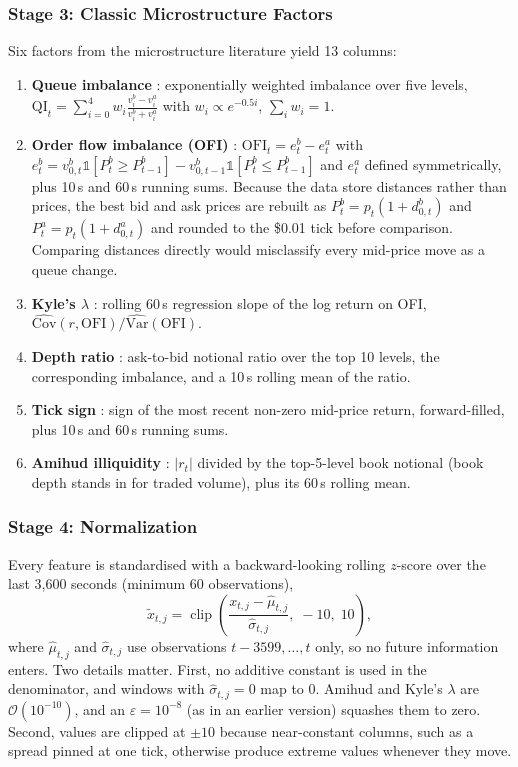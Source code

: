 \subsubsection{Stage 3: Classic Microstructure Factors}
Six factors from the microstructure literature yield 13 columns:
\begin{enumerate}
  \item \textbf{Queue imbalance} \cite{cont2014}: exponentially weighted imbalance over
  five levels, $\mathrm{QI}_t = \sum_{i=0}^{4} w_i \frac{v^b_i - v^a_i}{v^b_i + v^a_i}$ with
  $w_i \propto e^{-0.5 i}$, $\sum_i w_i = 1$.
  \item \textbf{Order flow imbalance (OFI)} \cite{cont2014}:
  $\mathrm{OFI}_t = e^b_t - e^a_t$ with
  $e^b_t = v^b_{0,t}\mathbb{1}[P^b_t \ge P^b_{t-1}] - v^b_{0,t-1}\mathbb{1}[P^b_t \le P^b_{t-1}]$
  and $e^a_t$ defined symmetrically, plus 10\,s and 60\,s running sums. Because the data
  store distances rather than prices, the best bid and ask prices are rebuilt as
  $P^b_t = p_t(1 + d^b_{0,t})$ and $P^a_t = p_t(1 + d^a_{0,t})$ and rounded to the
  \$0.01 tick before comparison. Comparing distances directly would misclassify every
  mid-price move as a queue change.
  \item \textbf{Kyle's $\lambda$} \cite{kyle1985}: rolling 60\,s regression slope of the log
  return on OFI, $\widehat{\mathrm{Cov}}(r,\mathrm{OFI}) / \widehat{\mathrm{Var}}(\mathrm{OFI})$.
  \item \textbf{Depth ratio} \cite{gould2013}: ask-to-bid notional ratio over the top
  10 levels, the corresponding imbalance, and a 10\,s rolling mean of the ratio.
  \item \textbf{Tick sign} \cite{leeready1991}: sign of the most recent non-zero mid-price
  return, forward-filled, plus 10\,s and 60\,s running sums.
  \item \textbf{Amihud illiquidity} \cite{amihud2002}: $|r_t|$ divided by the top-5-level
  book notional (book depth stands in for traded volume), plus its 60\,s rolling mean.
\end{enumerate}

\subsubsection{Stage 4: Normalization}
Every feature is standardised with a backward-looking rolling $z$-score over the last
3,600 seconds (minimum 60 observations),
\begin{equation}
  \tilde{x}_{t,j} = \operatorname{clip}\!\left(\frac{x_{t,j} - \hat\mu_{t,j}}{\hat\sigma_{t,j}},\; -10,\; 10\right),
  \label{eq:zscore}
\end{equation}
where $\hat\mu_{t,j}$ and $\hat\sigma_{t,j}$ use observations $t-3599,\dots,t$ only, so no
future information enters. Two details matter. First, no additive constant is used in the
denominator, and windows with $\hat\sigma_{t,j}=0$ map to 0. Amihud and Kyle's $\lambda$ are
$\mathcal{O}(10^{-10})$, and an $\varepsilon = 10^{-8}$ (as in an earlier version) squashes
them to zero. Second, values are clipped at $\pm 10$ because near-constant columns, such
as a spread pinned at one tick, otherwise produce extreme values whenever they move.

